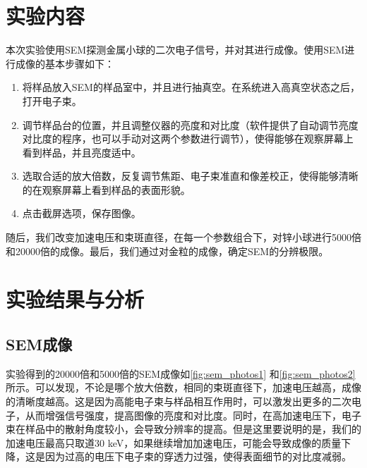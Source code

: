 \documentclass[font=default]{mpltx}
\begin{document}
\section{实验内容}
本次实验使用SEM探测金属小球的二次电子信号，并对其进行成像。使用SEM进行成像的基本步骤如下：
\begin{enumerate}
  \item 将样品放入SEM的样品室中，并且进行抽真空。在系统进入高真空状态之后，打开电子束。
  \item 调节样品台的位置，并且调整仪器的亮度和对比度（软件提供了自动调节亮度对比度的程序，也可以手动对这两个参数进行调节），使得能够在观察屏幕上看到样品，并且亮度适中。
  \item 选取合适的放大倍数，反复调节焦距、电子束准直和像差校正，使得能够清晰的在观察屏幕上看到样品的表面形貌。
  \item 点击截屏选项，保存图像。
\end{enumerate}

随后，我们改变加速电压和束斑直径，在每一个参数组合下，对锌小球进行5000倍和20000倍的成像。最后，我们通过对金粒的成像，确定SEM的分辨极限。
\section{实验结果与分析}
\subsection{SEM成像}
实验得到的20000倍和5000倍的SEM成像如\autoref{fig:sem_photos1} 和\autoref{fig:sem_photos2} 所示。可以发现，不论是哪个放大倍数，相同的束斑直径下，加速电压越高，成像的清晰度越高。这是因为高能电子束与样品相互作用时，可以激发出更多的二次电子，从而增强信号强度，提高图像的亮度和对比度。同时，在高加速电压下，电子束在样品中的散射角度较小，会导致分辨率的提高。但是这里要说明的是，我们的加速电压最高只取道30 keV，如果继续增加加速电压，可能会导致成像的质量下降，这是因为过高的电压下电子束的穿透力过强，使得表面细节的对比度减弱。
\end{document}
